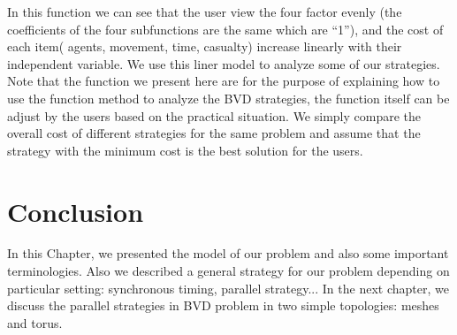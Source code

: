 In this function we can see that the user view the four factor evenly (the coefficients of the four subfunctions are the same which are ``1''), and the cost of each item( agents, movement, time, casualty) increase linearly with their independent variable. We use this liner model to analyze some of our strategies. Note that the function we present here are for the purpose of explaining how to use the function method to analyze the BVD strategies, the function itself can be adjust by the users based on the practical situation.
We simply compare the overall cost of different strategies for the same problem and assume that the strategy with the minimum cost is the best solution for the users.  
\section{Conclusion}
In this Chapter, we presented the model of our problem and also some important terminologies. Also we described a general strategy for our problem depending on particular setting: synchronous timing, parallel strategy... In the next chapter, we discuss the parallel strategies in BVD problem in two simple topologies: meshes and torus. 







 




